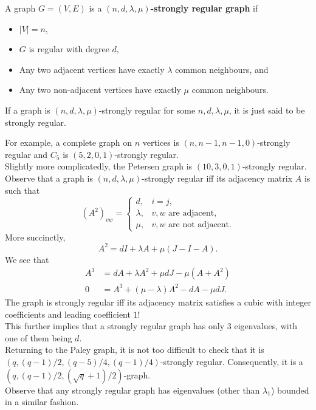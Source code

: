 			\begin{fdef}
				A graph $G=(V,E)$ is a \textbf{$(n,d,\lambda,\mu)$-strongly regular graph} if
				\begin{itemize}
					\item $|V|=n$,
					\item $G$ is regular with degree $d$,
					\item Any two adjacent vertices have exactly $\lambda$ common neighbours, and
					\item Any two non-adjacent vertices have exactly $\mu$ common neighbours.
				\end{itemize}
				If a graph is $(n,d,\lambda,\mu)$-strongly regular for some $n,d,\lambda,\mu$, it is just said to be strongly regular.
			\end{fdef}

			For example, a complete graph on $n$ vertices is $(n,n-1,n-1,0)$-strongly regular and $C_5$ is $(5,2,0,1)$-strongly regular.\\
			Slightly more complicatedly, the Petersen graph is $(10,3,0,1)$-strongly regular.\\

			Observe that a graph is $(n,d,\lambda,\mu)$-strongly regular iff its adjacency matrix $A$ is such that
			\[
			(A^2)_{vw} =
			\begin{cases}
				d, & i=j, \\
				\lambda, & v,w\text{ are adjacent}, \\
				\mu, & v,w\text{ are not adjacent}.
			\end{cases}
			\]
			More succinctly,
			\[ A^2 = d I + \lambda A + \mu(J - I - A). \]
			We see that
			\begin{align*}
				A^3 &= d A + \lambda A^2 + \mu d J - \mu(A+A^2) \\
				0 &= A^3 + (\mu-\lambda)A^2 - d A - \mu d J.
			\end{align*}
			The graph is strongly regular iff its adjacency matrix satisfies a cubic with integer coefficients and leading coefficient $1$!\\
			This further implies that a strongly regular graph has only $3$ eigenvalues, with one of them being $d$.\\

			Returning to the Paley graph, it is not too difficult to check that it is $( q , (q-1)/2 , (q-5)/4 , (q-1)/4 )$-strongly regular. Consequently, it is a $\left( q , (q-1)/2, (\sqrt{q}+1)/2 \right)$-graph.\\
			Observe that any strongly regular graph has eigenvalues (other than $\lambda_1$) bounded in a similar fashion.\\

